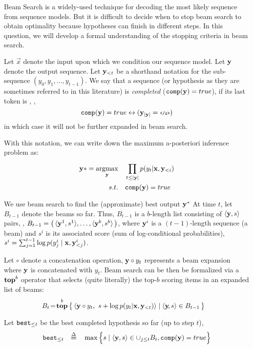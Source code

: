 Beam Search is a widely-used technique for decoding the most likely sequence from sequence models. 
But it is difficult to decide when to stop beam search to obtain optimality because hypotheses can finish in different steps. 
In this question, we will develop a formal understanding of the stopping criteria in beam search. 

Let $\vec{x}$ denote the input upon which we condition our sequence model. Let $\mathbf{y}$ denote the output sequence. 
Let $\mathbf{y}_{<t}$ be a shorthand notation for the sub-sequence $(y_{0}, y_{1}, \ldots, y_{t-1})$. 
We say that a sequence (or hypothesis as they are sometimes referred to in this literature) 
\vecy is \emph{completed} ($\texttt{comp}(\mathbf{y}) = true$), if its last token is \stopsym, \ie,
\[
\texttt{comp}(\mathbf{y}) = true \leftrightarrow (\mathbf{y}_{|\mathbf{y}|} = \mbox{\scriptsize \texttt{</s>}})
\]
in which case it will not be further expanded in beam search.

With this notation, we can write down the maximum a-posteriori inference problem as: 
\begin{align}
	\vecy* = \argmax_{\vecy} & \quad \prod_{t\leq |\vecy|}^{} p(y_t | \vecx,\vecy_{<i}) \\ 
	\st & \quad \completed(\vecy) = true
\end{align}

We use beam search to find the (approximate) best output $\mathbf{y}^*$
At time $t$, let $B_{t-1}$ denote the beams so far. Thus, $B_{t-1}$ is a $b$-length list consisting of $\langle {\ensuremath{\mathbf{y}}, s} \rangle$ pairs, 
\ie, $B_{t-1} = \big( \, \tuple{\vecy^1, s^1}, \ldots, \tuple{\vecy^b, s^b} \, \big)$, where $\mathbf{y}^i$ is a $(t-1)$-length sequence (a beam) 
and $s^i$ is its associated score (sum of log-conditional probabilities), \ie $s^i =  \sum_{j=1}^{t-1} \log p(y^i_j \mid \mathbf{x}, \mathbf{y}^i_{<j}) $. 

Let $\circ$ denote a concatenation operation, \ie $\mathbf{y} \circ y_t$ represents a beam expansion where 
$\mathbf{y}$ is concatenated with $y_t$. 
Beam search can be then be formalized via a $\toptop^b$ operator that selects (quite literally) the top-$b$ scoring items 
in an expanded list of beams:  
\begin{align}
	B_t\! &= \!\toptop^b  
	\big\{\, \tuple{\vecy \circ y_t, \ s + \log p(y_t | \vecx, \vecy_{<t})} \mid \tuple{\vecy\!, s} \in B_{t-1} \, \big\}
\end{align}

Let $\texttt{best}_{\leq t}$ be the best completed hypothesis so far (up to step $t$), \ie
\begin{align}
    \texttt{best}_{\leq t} \quad \overset{\Delta}{\textbf{=}} \quad \max \Big\{ s \mid \langle {\ensuremath{\mathbf{y}},s} \rangle \in \cup_{j \leq t} B_t,  \texttt{comp}(\mathbf{y}) = true \Big\}
\end{align}

